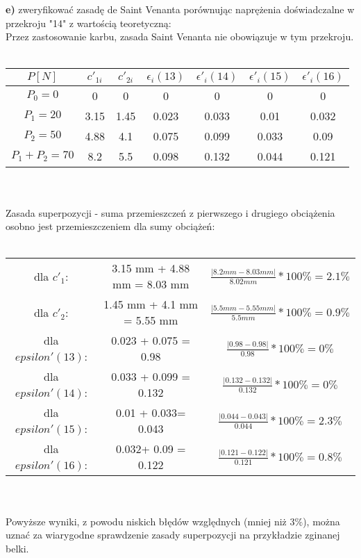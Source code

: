 \documentclass[11pt]{article}
\begin{document}
\textbf{e)} zweryfikować zasadę de Saint Venanta porównując naprężenia doświadczalne w przekroju "14" z wartością teoretyczną:\\
Przez zastosowanie karbu, zasada Saint Venanta nie obowiązuje w tym przekroju.\\\\
\begin{tabular}{|c|c|c|c|c|c|c|}\hline
$P[N]$ & $c'_{1i}$ & $c'_{2i}$ & $\epsilon_i(13)$ & $\epsilon'_i(14)$ & $\epsilon'_i(15)$ & $\epsilon'_i(16)$\\ \hline
$P_0 = 0$ & 0 & 0 & 0 & 0 & 0 & 0\\ \hline
$P_1 = 20$ & 3.15 & 1.45 & 0.023 & 0.033 & 0.01 & 0.032\\ \hline
$P_2 = 50$ & 4.88 & 4.1 & 0.075 & 0.099 & 0.033 & 0.09\\ \hline
$P_1 + P_2 = 70$ & 8.2 & 5.5 & 0.098 & 0.132 & 0.044 & 0.121\\ \hline

\end{tabular}\\\\
Zasada superpozycji - suma przemieszczeń z pierwszego i drugiego obciążenia osobno jest przemieszczeniem dla sumy obciążeń:\\\\
\begin{tabular}{c|c|c}
dla $c'_1$: & 3.15 mm + 4.88 mm = 8.03 mm & $\frac{|8.2 mm - 8.03 mm|}{8.02 mm} * 100\% = 2.1\%$\\
dla $c'_2$: & 1.45 mm + 4.1 mm = 5.55 mm & $\frac{|5.5 mm - 5.55 mm|}{5.5 mm} * 100\% = 0.9\%$\\
dla $epsilon'(13)$: & 0.023 + 0.075 = 0.98 & $\frac{|0.98 - 0.98|}{0.98} * 100\% = 0\%$\\
dla $epsilon'(14)$: & 0.033 + 0.099 = 0.132 & $\frac{|0.132 - 0.132|}{0.132} * 100\% = 0\%$\\
dla $epsilon'(15)$: & 0.01 + 0.033= 0.043 & $\frac{|0.044 - 0.043|}{0.044} * 100\% = 2.3\%$\\
dla $epsilon'(16)$: & 0.032+ 0.09 = 0.122 & $\frac{|0.121 - 0.122|}{0.121} * 100\% = 0.8\%$\\
\end{tabular}\\\\
Powyższe wyniki, z powodu niskich błędów względnych (mniej niż $3\%$), można uznać za wiarygodne sprawdzenie zasady superpozycji na przykładzie zginanej belki.\\
\end{document}

